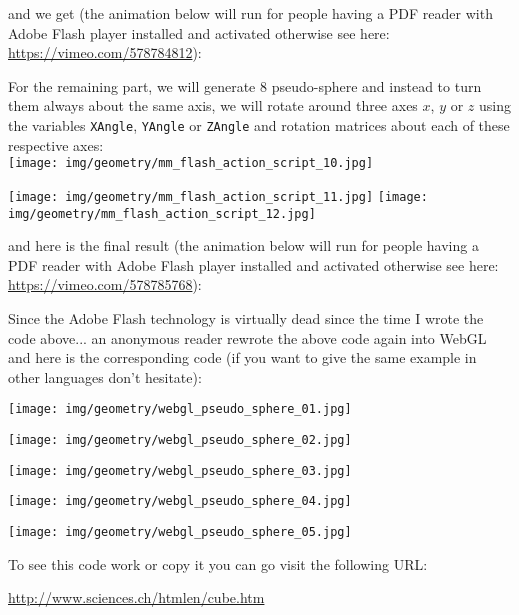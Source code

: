 	
	\begin{tcolorbox}[colframe=black,colback=white,sharp corners]
	and we get (the animation below will run for people having a PDF reader with Adobe Flash player installed and activated otherwise see here: \url{https://vimeo.com/578784812}):
	\begin{center}
	\centering
	\end{center}
	For the remaining part, we will generate $8$ pseudo-sphere and instead to turn them always about the same axis, we will rotate around three axes $x$, $y$ or $z$ using the variables \texttt{XAngle}, \texttt{YAngle} or \texttt{ZAngle} and rotation matrices about each of these respective axes:\\
	
	\texttt{[image: img/geometry/mm\_flash\_action\_script\_10.jpg]}
	\end{tcolorbox}
	
	\begin{tcolorbox}[colframe=black,colback=white,sharp corners]
	\texttt{[image: img/geometry/mm\_flash\_action\_script\_11.jpg]}
	\texttt{[image: img/geometry/mm\_flash\_action\_script\_12.jpg]}
	
	and here is the final result (the animation below will run for people having a PDF reader with Adobe Flash player installed and activated otherwise see here: \url{https://vimeo.com/578785768}):
	\begin{center}
	\centering
	\end{center}
	\end{tcolorbox}
	Since the Adobe Flash technology is virtually dead since the time I wrote the code above... an anonymous reader rewrote the above code again into WebGL and here is the corresponding code (if you want to give the same example in other languages don't hesitate):
	
	\texttt{[image: img/geometry/webgl\_pseudo\_sphere\_01.jpg]}
	
	\texttt{[image: img/geometry/webgl\_pseudo\_sphere\_02.jpg]}
	
	\texttt{[image: img/geometry/webgl\_pseudo\_sphere\_03.jpg]}
	
	\texttt{[image: img/geometry/webgl\_pseudo\_sphere\_04.jpg]}
	
	\texttt{[image: img/geometry/webgl\_pseudo\_sphere\_05.jpg]}
	
	To see this code work or copy it you can go visit the following URL:
	\begin{center}
	\url{http://www.sciences.ch/htmlen/cube.htm}
	\end{center}
	
